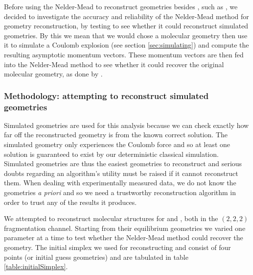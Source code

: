 Before using the Nelder-Mead to reconstruct geometries besides , such as , we decided to investigate the accuracy and reliability of the Nelder-Mead method for geometry reconstruction, by testing to see whether it could reconstruct simulated geometries. By this we mean that we would chose a molecular geometry then use it to simulate a Coulomb explosion (see section \ref{sec:simulating}) and compute the resulting asymptotic momentum vectors. These momentum vectors are then fed into the Nelder-Mead method to see whether it could recover the original molecular geometry, as done by \citet{Brichta09}.

\subsubsection*{Methodology: attempting to reconstruct simulated geometries}
Simulated geometries are used for this analysis because we can check exactly how far off the reconstructed geometry is from the known correct solution. The simulated geometry only experiences the Coulomb force and so at least one solution is guaranteed to exist by our deterministic classical simulation. Simulated geometries are thus the easiest geometries to reconstruct and serious doubts regarding an algorithm's utility must be raised if it cannot reconstruct them. When dealing with experimentally measured data, we do not know the geometries \textit{a priori} and so we need a trustworthy reconstruction algorithm in order to trust any of the results it produces.


We attempted to reconstruct molecular structures for  and , both in the $(2,2,2)$ fragmentation channel. Starting from their equilibrium geometries we varied one parameter at a time to test whether the Nelder-Mead method could recover the geometry. The initial simplex we used for reconstructing  and  consist of four points (or initial guess geometries) and are tabulated in table \ref{table:initialSimplex}.

